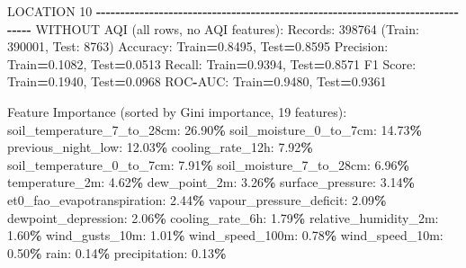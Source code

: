 \documentclass[
  letterpaper,
  DIV=11,
  numbers=noendperiod]{scrartcl}
\newenvironment{Shaded}{\begin{snugshade}}{\end{snugshade}}
\newcommand{\BuiltInTok}[1]{#1}
\newcommand{\DecValTok}[1]{\textcolor[rgb]{0.00,0.00,0.81}{#1}}
\newcommand{\FloatTok}[1]{\textcolor[rgb]{0.00,0.00,0.81}{#1}}
\newcommand{\NormalTok}[1]{#1}
\newcommand{\OperatorTok}[1]{\textcolor[rgb]{0.81,0.36,0.00}{\textbf{#1}}}
\begin{document}
\begin{Shaded}
\begin{Highlighting}[]
\NormalTok{LOCATION }\DecValTok{10}
\OperatorTok{{-}{-}{-}{-}{-}{-}{-}{-}{-}{-}{-}{-}{-}{-}{-}{-}{-}{-}{-}{-}{-}{-}{-}{-}{-}{-}{-}{-}{-}{-}{-}{-}{-}{-}{-}{-}{-}{-}{-}{-}{-}{-}{-}{-}{-}{-}{-}{-}{-}{-}{-}{-}{-}{-}{-}{-}{-}{-}{-}{-}{-}{-}{-}{-}{-}{-}{-}{-}{-}{-}{-}{-}{-}{-}{-}{-}{-}{-}{-}{-}}
\NormalTok{WITHOUT AQI (}\BuiltInTok{all}\NormalTok{ rows, no AQI features):}
\NormalTok{  Records: }\DecValTok{398764}\NormalTok{ (Train: }\DecValTok{390001}\NormalTok{, Test: }\DecValTok{8763}\NormalTok{)}
\NormalTok{  Accuracy: Train}\OperatorTok{=}\FloatTok{0.8495}\NormalTok{, Test}\OperatorTok{=}\FloatTok{0.8595}
\NormalTok{  Precision: Train}\OperatorTok{=}\FloatTok{0.1082}\NormalTok{, Test}\OperatorTok{=}\FloatTok{0.0513}
\NormalTok{  Recall: Train}\OperatorTok{=}\FloatTok{0.9394}\NormalTok{, Test}\OperatorTok{=}\FloatTok{0.8571}
\NormalTok{  F1 Score: Train}\OperatorTok{=}\FloatTok{0.1940}\NormalTok{, Test}\OperatorTok{=}\FloatTok{0.0968}
\NormalTok{  ROC}\OperatorTok{{-}}\NormalTok{AUC: Train}\OperatorTok{=}\FloatTok{0.9480}\NormalTok{, Test}\OperatorTok{=}\FloatTok{0.9361}

\NormalTok{  Feature Importance (}\BuiltInTok{sorted}\NormalTok{ by Gini importance, }\DecValTok{19}\NormalTok{ features):}
\NormalTok{    soil\_temperature\_7\_to\_28cm: }\FloatTok{26.90}\OperatorTok{\%}
\NormalTok{    soil\_moisture\_0\_to\_7cm: }\FloatTok{14.73}\OperatorTok{\%}
\NormalTok{    previous\_night\_low: }\FloatTok{12.03}\OperatorTok{\%}
\NormalTok{    cooling\_rate\_12h: }\FloatTok{7.92}\OperatorTok{\%}
\NormalTok{    soil\_temperature\_0\_to\_7cm: }\FloatTok{7.91}\OperatorTok{\%}
\NormalTok{    soil\_moisture\_7\_to\_28cm: }\FloatTok{6.96}\OperatorTok{\%}
\NormalTok{    temperature\_2m: }\FloatTok{4.62}\OperatorTok{\%}
\NormalTok{    dew\_point\_2m: }\FloatTok{3.26}\OperatorTok{\%}
\NormalTok{    surface\_pressure: }\FloatTok{3.14}\OperatorTok{\%}
\NormalTok{    et0\_fao\_evapotranspiration: }\FloatTok{2.44}\OperatorTok{\%}
\NormalTok{    vapour\_pressure\_deficit: }\FloatTok{2.09}\OperatorTok{\%}
\NormalTok{    dewpoint\_depression: }\FloatTok{2.06}\OperatorTok{\%}
\NormalTok{    cooling\_rate\_6h: }\FloatTok{1.79}\OperatorTok{\%}
\NormalTok{    relative\_humidity\_2m: }\FloatTok{1.60}\OperatorTok{\%}
\NormalTok{    wind\_gusts\_10m: }\FloatTok{1.01}\OperatorTok{\%}
\NormalTok{    wind\_speed\_100m: }\FloatTok{0.78}\OperatorTok{\%}
\NormalTok{    wind\_speed\_10m: }\FloatTok{0.50}\OperatorTok{\%}
\NormalTok{    rain: }\FloatTok{0.14}\OperatorTok{\%}
\NormalTok{    precipitation: }\FloatTok{0.13}\OperatorTok{\%}


\end{Highlighting}
\end{Shaded}
\end{document}
